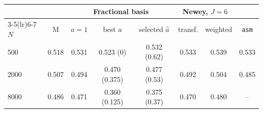 \begin{tabular}{lccccccc}
\toprule
 & & \multicolumn{3}{c}{Fractional basis} & \multicolumn{2}{c}{Newey, $J=6$} & \\
\cmidrule(lr){3-5}\cmidrule(lr){6-7}
$N$ & M & $a=1$ & best $a$ & selected $\hat a$ & transf. & weighted & \texttt{asm} \\
\midrule
500 & 0.518 & 0.531 & 0.523 (0) & 0.532 (0.62) & 0.533 & 0.539 & 0.533 \\
2000 & 0.507 & 0.494 & 0.470 (0.375) & 0.477 (0.53) & 0.492 & 0.504 & 0.485 \\
8000 & 0.486 & 0.471 & 0.360 (0.125) & 0.375 (0.37) & 0.470 & 0.480 & -- \\
\bottomrule
\end{tabular}
